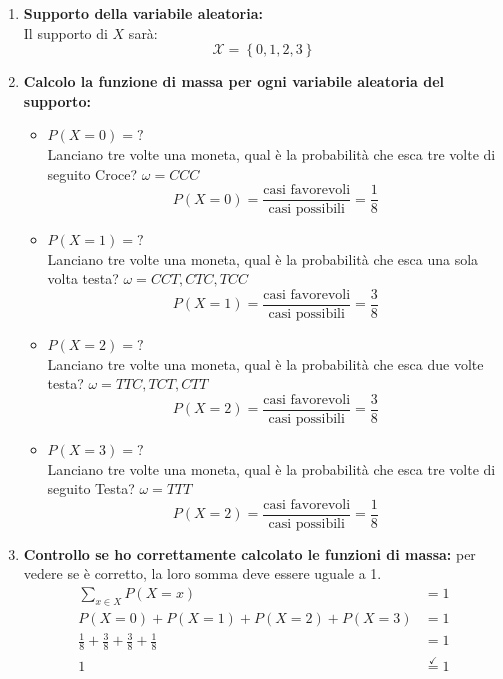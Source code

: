 \documentclass{article}  %
\theoremstyle{definition}
\begin{document}
\begin{esercizio}[Esercizio]
\begin{enumerate}
		\item \textbf{Supporto della variabile aleatoria:} \\
		      Il supporto di $X$ sarà:
		      \[
			      \mathscr{X}= \left\{0,1,2,3 \right\}
		      \]
		\item \textbf{Calcolo la funzione di massa per ogni variabile aleatoria del supporto:}
		      \begin{itemize}
			      \item $P(X=0)=?$ \\
			            Lanciano tre volte una moneta, qual è la probabilità che esca tre volte di seguito Croce? $\omega=CCC$
			            \[
				            P(X=0)=\frac{\text{casi favorevoli}}{\text{casi possibili}}=\frac{1}{8}
			            \]
			      \item $P(X=1)=?$ \\
			            Lanciano tre volte una moneta, qual è la probabilità che esca una sola volta testa? $\omega=CCT,CTC,TCC$
			            \[
				            P(X=1)=\frac{\text{casi favorevoli}}{\text{casi possibili}}=\frac{3}{8}
			            \]
			      \item $P(X=2)=?$ \\
			            Lanciano tre volte una moneta, qual è la probabilità che esca due volte testa? $\omega=TTC,TCT,CTT$
			            \[
				            P(X=2)=\frac{\text{casi favorevoli}}{\text{casi possibili}}=\frac{3}{8}
			            \]
			      \item $P(X=3)=?$ \\
			            Lanciano tre volte una moneta, qual è la probabilità che esca tre volte di seguito Testa? $\omega=TTT$
			            \[
				            P(X=2)=\frac{\text{casi favorevoli}}{\text{casi possibili}}=\frac{1}{8}
			            \]
		      \end{itemize}
		\item \textbf{Controllo se ho correttamente calcolato le funzioni di massa:} per vedere se è corretto, la loro somma deve essere uguale a 1.
		      \begin{align*}
			      \sum_{x \in X} P(X = x)
			       & = 1                       \\[6pt]
			      P(X = 0) + P(X = 1) + P(X = 2) + P(X = 3)
			       & = 1                       \\[6pt]
			      \frac{1}{8}+\frac{3}{8}+\frac{3}{8}+\frac{1}{8}
			       & = 1                       \\[6pt]
			      1
			       & \overset{\checkmark}{=} 1
		      \end{align*}
	\end{enumerate}
\end{esercizio}
\end{document}
